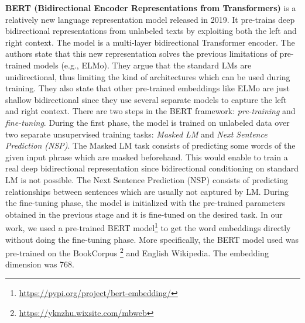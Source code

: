 \documentclass[11pt,a4paper]{article}
\begin{document}
\textbf{BERT (Bidirectional Encoder Representations from Transformers)} \cite{devlin2018bert} is a relatively new language representation model released in 2019. It pre-trains deep bidirectional representations from unlabeled texts by exploiting both the left and right context. The model is a multi-layer bidirectional Transformer encoder. The authors state that this new representation solves the previous limitations of pre-trained models (e.g., ELMo). They argue that the standard LMs are unidirectional, thus limiting the kind of architectures which can be used during training. They also state that other pre-trained embeddings like ELMo are just shallow bidirectional since they use several separate models to capture the left and right context.
There are two steps in the BERT framework: \textit{pre-training} and \textit{fine-tuning}. During the first phase, the model is trained on unlabeled data over two separate unsupervised training tasks: \textit{Masked LM} and \textit{Next Sentence Prediction (NSP)}.  The Masked LM task consists of predicting some words of the given input phrase which are masked beforehand.  This would enable to train a real deep bidirectional representation since bidirectional conditioning on standard LM is not possible. The Next Sentence Prediction (NSP) consists of predicting relationships between sentences which are usually not captured by LM. 
During the fine-tuning phase, the model is initialized with the pre-trained parameters obtained in the previous stage and it is fine-tuned on the desired task. 
In our work, we used a pre-trained BERT model\footnote{\url{https://pypi.org/project/bert-embedding/}} to get the word embeddings directly without doing the fine-tuning phase. More specifically, the BERT model used was pre-trained on the BookCorpus \footnote{\url{https://yknzhu.wixsite.com/mbweb}} and English Wikipedia. The embedding dimension was 768.  
\end{document}
